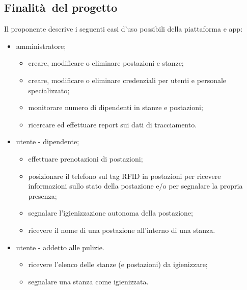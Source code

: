 \subsection{Finalità del progetto}
Il proponente descrive i seguenti casi d'uso possibili della piattaforma e app:
\begin{itemize}
    \item amministratore;
    \begin{itemize}
        \item creare, modificare o eliminare postazioni e stanze;
        \item creare, modificare o eliminare credenziali per utenti e personale specializzato;
        \item monitorare numero di dipendenti in stanze e postazioni;
        \item ricercare ed effettuare report sui dati di tracciamento.
    \end{itemize}
    \item utente - dipendente;
    \begin{itemize}
        \item effettuare prenotazioni di postazioni;
        \item posizionare il telefono sul tag RFID in postazioni per ricevere informazioni sullo stato della postazione e/o per segnalare la propria presenza;
        \item segnalare l'igienizzazione autonoma della postazione;
        \item ricevere il nome di una postazione all'interno di una stanza.
    \end{itemize}
    \item utente - addetto alle pulizie.
    \begin{itemize}
        \item ricevere l'elenco delle stanze (e postazioni) da igienizzare;
        \item segnalare una stanza come igienizzata.
    \end{itemize}
\end{itemize}
